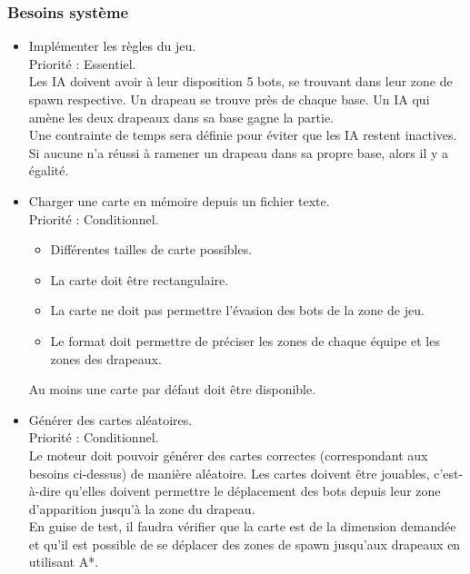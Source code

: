 \subsubsection{Besoins système}
    
    \begin{itemize}
        
        \item Implémenter les règles du jeu. \\
                Priorité : Essentiel.\\
                Les IA doivent avoir à leur disposition 5 bots, se trouvant dans leur zone de spawn respective. Un drapeau se trouve près de chaque base. Un IA qui amène les deux drapeaux dans sa base gagne la partie.\\
                Une contrainte de temps sera définie pour éviter que les IA restent inactives. Si aucune n'a réussi à ramener un drapeau dans sa propre base, alors il y a égalité.\\
                
        \item Charger une carte en mémoire depuis un fichier texte. \\
                Priorité : Conditionnel.
                \begin{itemize}
                    \item Différentes tailles de carte possibles.
                    \item La carte doit être rectangulaire.
                    \item La carte ne doit pas permettre l'évasion des bots de la zone de jeu.
                    \item Le format doit permettre de préciser les zones de chaque équipe et les zones des drapeaux.
                \end{itemize}
                Au moins une carte par défaut doit être disponible. \\
                
        \item Générer des cartes aléatoires.\\
            Priorité : Conditionnel.\\
            Le moteur doit pouvoir générer des cartes correctes (correspondant aux besoins ci-dessus) de manière aléatoire. Les cartes doivent être jouables, c'est-à-dire qu'elles doivent permettre le déplacement des bots depuis leur zone d'apparition jusqu'à la zone du drapeau.\\
            En guise de test, il faudra vérifier que la carte est de la dimension demandée et qu'il est possible de se déplacer des zones de spawn jusqu'aux drapeaux en utilisant A*.\\


\end{itemize}
